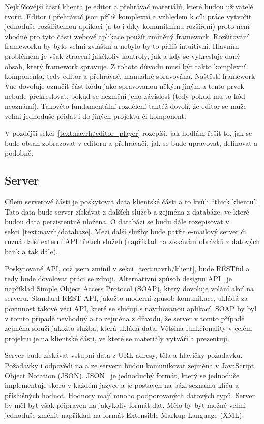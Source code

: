 Nejklíčovější částí klienta je editor a přehrávač materiálů, které budou uživatelé tvořit.
Editor i přehrávač jsou příliš komplexní a vzhledem k cíli práce vytvořit jednoduše rozšiřitelnou aplikaci (a to i díky komunitnímu rozšíření) proto není vhodné pro tyto části webové aplikace použít zmíněný framework.
Rozšiřování frameworku by bylo velmi zvláštní a nebylo by to příliš intuitivní.
Hlavním problémem je však ztracení jakékoliv kontroly, jak a kdy se vykresluje daný obsah, který framework spravuje.
Z tohoto důvodu musí být takto komplexní komponenta, tedy editor a přehrávač, manuálně spravována.
Naštěstí framework Vue dovoluje označit část kódu jako spravovanou někým jiným a tento prvek nebude překreslovat, pokud se nezmění jeho závislost (tedy pokud mu to kód neoznámí). 
Takovéto fundamentální rozdělení taktéž dovolí, že editor se může velmi jednoduše přidat i do jiných projektů či komponent.

V pozdější sekci~\ref{text:navrh/editor_player} rozepíši, jak hodlám řešit to, jak se bude obsah zobrazovat v editoru a přehrávači, jak se bude upravovat, definovat a podobně.

\subsection{Server}\label{text:navrh/server}

Cílem serverové části je poskytovat data klientské části a to kvůli \enquote{thick klientu}. 
Tato data bude server získávat z dalších služeb a zejména z databáze, ve které budou data perzistentně uložena.
O databázi se budu dále rozepisovat v sekci~\ref{text:navrh/databaze}.
Mezi další služby bude patřit e-mailový server či různá další externí API třetích služeb (například na získávání obrázků z datových bank a tak dále).

Poskytované API, což jsem zmínil v sekci~\ref{text:navrh/klient}, bude RESTful a tedy bude dovolovat práci se zdroji. 
Alternativní způsob designu API~\cite{richardson_2013} je například Simple Object Access Protocol (SOAP), který dovoluje volání akcí na serveru.
Standard REST API, jakožto moderní způsob komunikace, ukládá za povinnost takové věci API, které se slučují s navrhovanou aplikací.
SOAP by byl v tomto případě nevhodný a to zejména z důvodu, že server v tomto případě zejména slouží jakožto služba, která ukládá data.
Většina funkcionality v celém projektu je na klientské části, ve které se materiály vytváří a prezentují.

Server bude získávat vstupní data z URL adresy, těla a hlavičky požadavku.
Požadavky i odpovědi na a ze serveru budou komunikovat zejména v JavaScript Object Notation (JSON).
JSON~\cite{richardson_2013, uzayr2022frontend} je jednoduchý formát, který se jednoduše implementuje skoro v každém jazyce a je postaven na bázi seznamu klíčů a příslušných hodnot.
Hodnoty mají mnoho podporovaných datových typů.
Server by měl být však připraven na jakýkoliv formát dat.
Mělo by být možné velmi jednoduše změnit například na formát Extensible Markup Language (XML).

